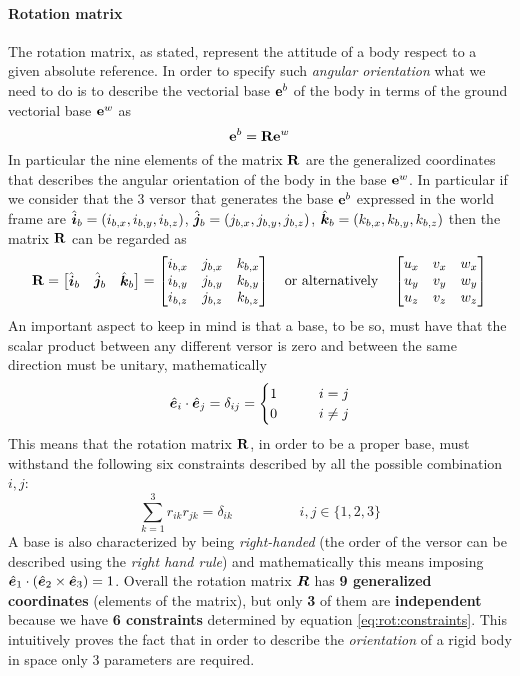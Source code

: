 	\paragraph{Rotation matrix} The rotation matrix, as stated, represent the attitude of a body respect to a given absolute reference. In order to specify such \textit{angular orientation} what we need to do is to describe the vectorial base $\mathbf{e}^b$ of the body in terms of the ground vectorial base $\mathbf{e}^w$ as
	\begin{equation}
		\mathbf{e}^b = \mathbf{R} \mathbf{e}^w
	\end{equation}
	In particular the nine elements of the matrix $\mathbf{R}$ are the generalized coordinates that describes the angular orientation of the body in the base $\mathbf{e}^w$. In particular if we consider that the 3 versor that generates the base $\mathbf{e}^b$ expressed in the world frame are $\hat{\boldsymbol{i}}_b = (i_{b,x}, i_{b,y}, i_{b,z})$, $\hat{\boldsymbol{j}}_b = (j_{b,x}, j_{b,y}, j_{b,z})$, $\hat{\boldsymbol{k}}_b = (k_{b,x}, k_{b,y}, k_{b,z})$ then the matrix $\mathbf{R}$ can be regarded as
	\begin{equation} \label{eq:rot:rotationmatrix}
		\mathbf{R}= \begin{bmatrix} \hat{\boldsymbol{i}}_b & \hat{\boldsymbol{j}}_b & \hat{\boldsymbol{k}}_b \end{bmatrix} = \begin{bmatrix}  i_{b,x} & j_{b,x} & k_{b,x} \\ 
		i_{b,y} & j_{b,y} & k_{b,y} \\
		i_{b,z} & j_{b,z} & k_{b,z} \\ \end{bmatrix} \quad \textrm{or alternatively} \quad \begin{bmatrix}  u_x  &  v_x & w_x \\ u_y  &  v_y & w_y \\ u_z  &  v_z & w_z  \end{bmatrix}
	\end{equation}	
	An important aspect to keep in mind is that a base, to be so, must have that the scalar product between any different versor is zero and between the same direction must be unitary, mathematically
	\[ \hat{\boldsymbol{e}}_i \cdot \hat{\boldsymbol{e}}_j = \delta_{ij} = \begin{cases}
		1 \qquad & i = j \\ 0 & i \neq j
	\end{cases} \]
	This means that the rotation matrix $\mathbf{R}$, in order to be a proper base, must withstand the following six constraints described by all the possible combination $i,j$:
	\begin{equation} \label{eq:rot:constraints}
		\sum_{k=1}^3 r_{ik} r_{jk} = \delta_{ik} \hspace{2cm} i,j \in \{1,2,3\}
	\end{equation}
	A base is also characterized by being \textit{right-handed} (the order of the versor can be described using the \textit{right hand rule}) and mathematically this means imposing $\hat{\boldsymbol{e}}_1 \cdot( \hat{\boldsymbol{e}}_2\times \hat{\boldsymbol{e}}_3) = 1$. Overall the rotation matrix $\boldsymbol{R}$ has \textbf{9 generalized coordinates} (elements of the matrix), but only \textbf{3} of them are \textbf{independent} because we have \textbf{6 constraints} determined by equation \ref{eq:rot:constraints}. This intuitively proves the fact that in order to describe the \textit{orientation} of a rigid body in space only 3 parameters are required.
	
